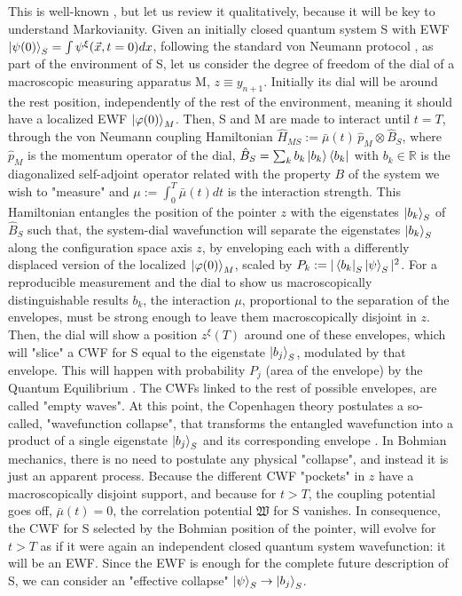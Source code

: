 \documentclass[11pt, a4paper]{article} %
\newcommand{\R}{\mathbb{R}} %
\begin{document}
This is well-known \cite{Durr, Absolute, operatorsObservables}, but let us review it qualitatively, because it will be key to understand Markovianity. Given an initially closed quantum system S with EWF $\ket{\psi(0)}_S=\int\psi^\xi(\vec{x},t=0)dx$, following the standard von Neumann protocol \cite{vonNeumann}, as part of the environment of S, let us consider the degree of freedom of the dial of a macroscopic measuring apparatus M, $z\equiv y_{n+1}$. Initially its dial will be around the rest position, independently of the rest of the environment, meaning it should have a localized EWF $\ket{\varphi(0)}_M$. Then, S and M are made to interact until $t=T$, through the von Neumann coupling Hamiltonian $\hat{H}_{MS}:=\bar{\mu}(t)\,\hat{p}_M\otimes \hat{B}_S$, where $\hat{p}_M$ is the momentum operator of the dial, $\hat{B}_S=\sum_kb_k\ket{b_k}\bra{b_k}$ with $b_k\in\R$ is the diagonalized self-adjoint operator related with the property $B$ of the system we wish to "measure" and $\mu:=\int_0^T\bar{\mu}(t)dt$ is the interaction strength. This Hamiltonian entangles the position of the pointer $z$ with the eigenstates $\ket{b_k}_S$ of $\hat{B}_S$ such that, the system-dial wavefunction will separate the eigenstates $\ket{b_k}_S$ along the configuration space axis $z$, by enveloping each with a differently displaced version of the localized $\ket{\varphi(0)}_M$, scaled by $P_k:=|\bra{b_k}_S\ket{\psi}_S|^2$. For a reproducible measurement \cite{operatorsObservables} and the dial to show us macroscopically distinguishable results $b_k$, the interaction $\mu$, proportional to the separation of the envelopes, must be strong enough to leave them macroscopically disjoint in $z$. Then, the dial will show a position $z^\xi(T)$ around one of these envelopes, which will "slice" a CWF for S equal to the eigenstate $\ket{b_j}_S$, modulated by that envelope. This will happen with probability $P_j$ (area of the envelope) by the Quantum Equilibrium \cite{Absolute}. The CWFs linked to the rest of possible envelopes, are called "empty waves". At this point, the Copenhagen theory postulates a so-called, "wavefunction collapse", that transforms the entangled wavefunction into a product of a single eigenstate $\ket{b_j}_S$ and its corresponding envelope \cite{vonNeumann}. In Bohmian mechanics, there is no need to postulate any physical "collapse", and instead it is just an apparent process. Because the different CWF "pockets" in $z$ have a macroscopically disjoint support, and because for $t>T$, the coupling potential goes off, $\bar{\mu}(t)=0$, the correlation potential $\mathfrak{W}$ for S vanishes. In consequence, the CWF for S selected by the Bohmian position of the pointer, will evolve for $t>T$ as if it were again an independent closed quantum system wavefunction: it will be an EWF. Since the EWF is enough for the complete future description of S, we can consider an "effective collapse" $\ket{\psi}_S\rightarrow\ket{b_j}_S$.
\end{document}
